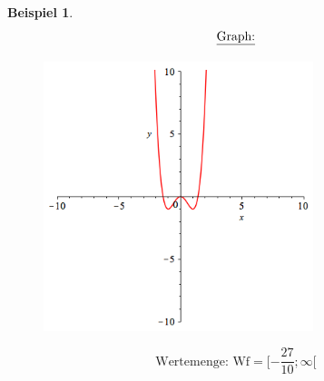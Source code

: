 \documentclass{report}
\newtheorem{myexample}{Beispiel}
\begin{document}
\begin{myexample}
\begin{eqnarray*}
		\shortintertext{\underline{Graph:}}
	\end{eqnarray*}
		\begin{figure}[H]
			\centering
			\includegraphics[width=0.7\textwidth]{images/x^4-2x^2.png}
		\end{figure}
		\begin{equation*}\text{Wertemenge: Wf}=[-\frac{27}{10}; \infty[\end{equation*}
\end{myexample}
\newpage

\newpage
\end{document}
